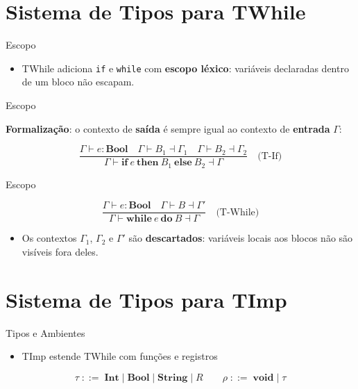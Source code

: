 \section{Sistema de Tipos para
TWhile}\label{sistema-de-tipos-para-twhile}

\begin{frame}[fragile]{Escopo}

    \begin{itemize}

        \item
        TWhile adiciona \texttt{if} e
        \texttt{while} com \textbf{escopo léxico}: variáveis
        declaradas dentro de um bloco não escapam.
    \end{itemize}
\end{frame}

\begin{frame}{Escopo}

    \textbf{Formalização}: o contexto de \textbf{saída} é sempre igual ao
    contexto de \textbf{entrada} \(\Gamma\):

    \[\frac{\Gamma \vdash e : \mathbf{Bool} \quad \Gamma \vdash B_1 \dashv \Gamma_1 \quad \Gamma \vdash B_2 \dashv \Gamma_2}{\Gamma \vdash \mathbf{if}\ e\ \mathbf{then}\ B_1\ \mathbf{else}\ B_2 \dashv \Gamma} \quad\text{(T-If)}\]
\end{frame}

\begin{frame}{Escopo}

    \[\frac{\Gamma \vdash e : \mathbf{Bool} \quad \Gamma \vdash B \dashv \Gamma'}{\Gamma \vdash \mathbf{while}\ e\ \mathbf{do}\ B \dashv \Gamma} \quad\text{(T-While)}\]

    \begin{itemize}

        \item
        Os contextos \(\Gamma_1\), \(\Gamma_2\) e \(\Gamma'\) são
        \textbf{descartados}: variáveis locais aos blocos não são visíveis
        fora deles.
    \end{itemize}
\end{frame}


\section{Sistema de Tipos para TImp}\label{sistema-de-tipos-para-timp}

\begin{frame}{Tipos e Ambientes}

    \begin{itemize}

        \item
        TImp estende TWhile com funções e registros
    \end{itemize}

    \[\tau \;::=\; \mathbf{Int} \mid \mathbf{Bool} \mid \mathbf{String} \mid R \qquad \rho \;::=\; \mathbf{void} \mid \tau\]
\end{frame}

